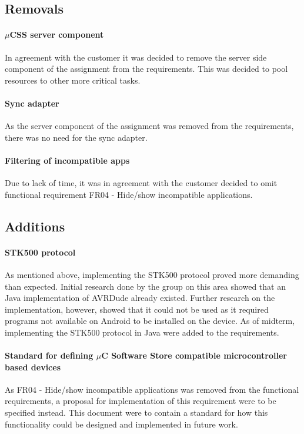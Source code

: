 \subsection{Removals}
\paragraph{$\mu$CSS server component} In agreement with the customer it was decided to remove the server side component of the assignment from the requirements. This was decided to pool resources to other more critical tasks.

\paragraph{Sync adapter} As the server component of the assignment was removed from the requirements, there was no need for the sync adapter.

\paragraph{Filtering of incompatible apps} Due to lack of time, it was in agreement with the customer decided to omit functional requirement FR04 - Hide/show incompatible applications.

\subsection{Additions}
\paragraph{STK500 protocol} As mentioned above, implementing the STK500 protocol proved more demanding than expected. Initial research done by the group on this area showed that an Java implementation of AVRDude already existed. Further research on the implementation, however, showed that it could not be used as it required programs not available on Android to be installed on the device. As of midterm, implementing the STK500 protocol in Java were added to the requirements.

\paragraph{Standard for defining $\mu$C Software Store compatible microcontroller based devices} As FR04 - Hide/show incompatible applications was removed from the functional requirements, a proposal for implementation of this requirement were to be specified instead. This document were to contain a standard for how this functionality could be designed and implemented in future work.

